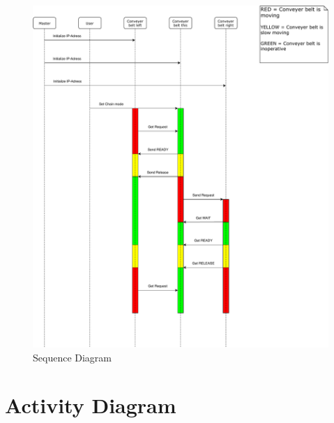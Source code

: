 \documentclass[a4paper,12pt,twoside]{scrreprt}
\begin{document}
\begin{figure}[H]
	\centering
	\includegraphics[width=\textwidth,height=\textheight,keepaspectratio]{sequenceDiagram/SequenceDiagram.pdf}
	\caption[Sequence Diagram]{Sequence Diagram}
	\label{fig:SequenceDiagram}
\end{figure}

\newpage

\section{Activity Diagram}
\label{chap:Activity_Diagram}
\end{document}

